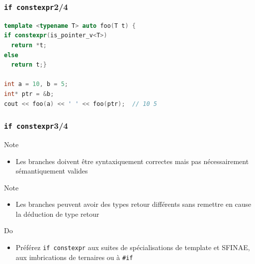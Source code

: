 \documentclass[C++.tex]{subfiles}
\begin{document}
\begin{frame}[fragile]
	\frametitle{\lstinline|if constexpr|\titlehfill{}2/4}
	\begin{lstlisting}[language=C++]
template <typename T> auto foo(T t) {
if constexpr(is_pointer_v<T>)
  return *t;
else
  return t;}

int a = 10, b = 5;
int* ptr = &b;
cout << foo(a) << ' ' << foo(ptr);  // 10 5\end{lstlisting}
\end{frame}

\begin{frame}[fragile]
	\frametitle{\lstinline|if constexpr|\titlehfill{}3/4}
	\begin{block}{Note}
		\begin{itemize}
			\item Les branches doivent être syntaxiquement correctes mais pas nécessairement sémantiquement valides
		\end{itemize}
	\end{block}

	\begin{block}{Note}
		\begin{itemize}
			\item Les branches peuvent avoir des types retour différents sans remettre en cause la déduction de type retour
		\end{itemize}
	\end{block}

	\begin{exampleblock}{Do}
		\begin{itemize}
			\item Préférez \lstinline|if constexpr| aux suites de spécialisations de template et SFINAE, aux imbrications de ternaires ou à \lstinline|#if|
		\end{itemize}
	\end{exampleblock}
\end{frame}
\end{document}
